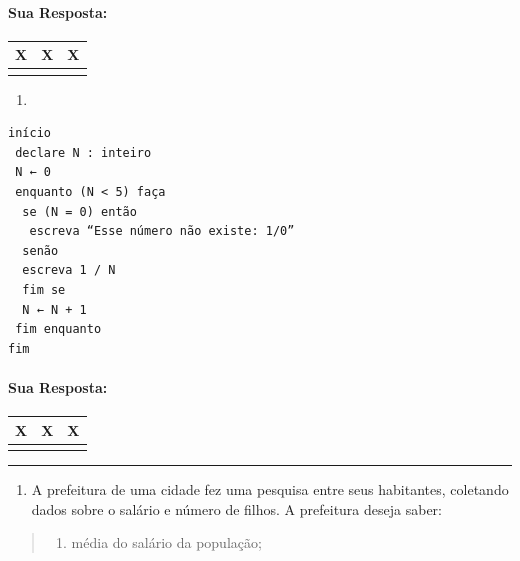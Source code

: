 \documentclass[12pt,a4paper]{article}
\providecommand{\tightlist}{%
      \setlength{\itemsep}{0pt}\setlength{\parskip}{0pt}}
\begin{document}
    \hypertarget{sua-resposta}{%
\paragraph{Sua Resposta:}\label{sua-resposta}}

\begin{longtable}[]{@{}ccc@{}}
\toprule
X & X & X\tabularnewline
\midrule
\endhead
& &\tabularnewline
\bottomrule
\end{longtable}

    \begin{enumerate}
\def\labelenumi{\alph{enumi})}
\setcounter{enumi}{7}
\tightlist
\item
\end{enumerate}

\begin{verbatim}
início
 declare N : inteiro
 N ← 0
 enquanto (N < 5) faça
  se (N = 0) então
   escreva “Esse número não existe: 1/0”
  senão
  escreva 1 / N
  fim se
  N ← N + 1
 fim enquanto
fim 
\end{verbatim}

    \hypertarget{sua-resposta}{%
\paragraph{Sua Resposta:}\label{sua-resposta}}

\begin{longtable}[]{@{}ccc@{}}
\toprule
X & X & X\tabularnewline
\midrule
\endhead
& &\tabularnewline
\bottomrule
\end{longtable}

    \begin{center}\rule{0.5\linewidth}{0.5pt}\end{center}

\begin{enumerate}
\def\labelenumi{\arabic{enumi}.}
\setcounter{enumi}{4}
\tightlist
\item
  A prefeitura de uma cidade fez uma pesquisa entre seus habitantes,
  coletando dados sobre o salário e número de filhos. A prefeitura
  deseja saber:
\end{enumerate}

\begin{quote}
\begin{enumerate}
\def\labelenumi{\alph{enumi})}
\tightlist
\item
  média do salário da população;
\end{enumerate}
\end{quote}
\end{document}
